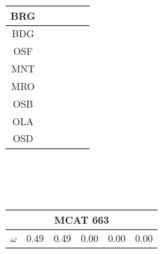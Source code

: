 \documentclass[12pt]{article}
\begin{document}
\begin{landscape}
\begin{figure}
\begin{minipage}[c]{0.3\textwidth}
\begin{tabular}{|c|c|c|c|c|c|}
        BRG&\cellcolor[HTML]{377EB8}&\cellcolor[HTML]{E41A1C}&\cellcolor[HTML]{E41A1C}&\cellcolor[HTML]{377EB8}&\cellcolor[HTML]{377EB8}\\ \hline %
        BDG&\cellcolor[HTML]{377EB8}&\cellcolor[HTML]{377EB8}&\cellcolor[HTML]{377EB8}&\cellcolor[HTML]{377EB8}&\cellcolor[HTML]{377EB8}\\ \hline %
        OSF&\cellcolor[HTML]{4DAF4A}&\cellcolor[HTML]{377EB8}&\cellcolor[HTML]{377EB8}&\cellcolor[HTML]{4DAF4A}&\cellcolor[HTML]{377EB8}\\ \hline %
        MNT&\cellcolor[HTML]{4DAF4A}&\cellcolor[HTML]{377EB8}&\cellcolor[HTML]{377EB8}&\cellcolor[HTML]{4DAF4A}&\cellcolor[HTML]{4DAF4A}\\ \hline %
        MRO&\cellcolor[HTML]{4DAF4A}&\cellcolor[HTML]{4DAF4A}&\cellcolor[HTML]{4DAF4A}&\cellcolor[HTML]{4DAF4A}&\cellcolor[HTML]{4DAF4A}\\ \hline %
        OSB&\cellcolor[HTML]{984EA3}&\cellcolor[HTML]{984EA3}&\cellcolor[HTML]{984EA3}&\cellcolor[HTML]{984EA3}&\cellcolor[HTML]{4DAF4A}\\ \hline %
        OLA&\cellcolor[HTML]{984EA3}&\cellcolor[HTML]{984EA3}&\cellcolor[HTML]{FF7F00}&\cellcolor[HTML]{FF7F00}&\cellcolor[HTML]{984EA3}\\ \hline %
        OSD&\cellcolor[HTML]{984EA3}&\cellcolor[HTML]{984EA3}&\cellcolor[HTML]{FF7F00}&\cellcolor[HTML]{FF7F00}&\cellcolor[HTML]{984EA3}\\ \hline %
\end{tabular}\\$~$\\$~$\\
\hspace*{-2.5cm}
\begin{tabular}{|c|c|c|c|c|c|}%
         \hline \multicolumn{6}{|c|}{MCAT 663} \\ \hline
         $\omega$&0.49&0.49&0.00&0.00&0.00\\ \hline %

\end{tabular}
\end{minipage}
\end{figure}
\end{landscape}
\end{document}
